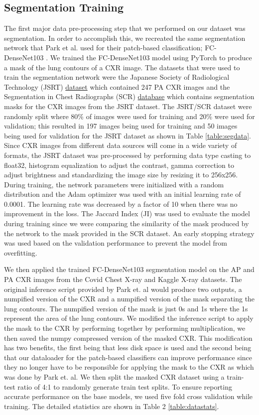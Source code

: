 \documentclass{sigkddExp}
\begin{document}
\subsection{Segmentation Training}
The first major data pre-processing step that we performed on our dataset was
segmentation. In order to accomplish this, we recreated the same segmentation
network that Park et al. used for their patch-based classification;
FC-DenseNet103 \cite{DBLP:journals/corr/JegouDVRB16}. We trained the
FC-DenseNet103 model using PyTorch to produce a mask of the lung contours of a
CXR image. The datasets that were used to train the segmentation network were
the Japanese Society of Radiological Technology (JSRT)
\href{http://db.jsrt.or.jp/eng.php}{dataset} which contained 247 PA CXR images
and the Segmentation in Chest Radiographs (SCR)
\href{https://www.isi.uu.nl/Research/Databases/SCR/}{database} which contains
segmentation masks for the CXR images from the JSRT dataset. The JSRT/SCR
dataset were randomly split where 80\% of images were used for training and 20\%
were used for validation; this resulted in 197 images being used for training
and 50 images being used for validation for the JSRT dataset as shown in Table
\ref{table:segdata}. Since CXR images from different data sources will come in a
wide variety of formats, the JSRT dataset was pre-processed by performing data
type casting to float32, histogram equalization to adjust the contrast, gamma
correction to adjust brightness and standardizing the image size by resizing it
to 256x256. During training, the network parameters were initialized with a
random distribution and the Adam optimizer was used with an initial learning
rate of 0.0001. The learning rate was decreased by a factor of 10 when there was
no improvement in the loss. The Jaccard Index (JI) was used to evaluate the
model during training since we were comparing the similarity of the mask
produced by the network to the mask provided in the SCR dataset. An early
stopping strategy was used based on the validation performance to prevent the
model from overfitting.

We then applied the trained FC-DenseNet103 segmentation model on the AP and PA
CXR images from the Covid Chest X-ray and Kaggle X-ray datasets. The original
inference script provided by Park et. al would produce two outputs, a numpified
version of the CXR and a numpified version of the mask separating the lung
contours. The numpified version of the mask is just 0s and 1s where the 1s
represent the area of the lung contours.  We modified the inference script to
apply the mask to the CXR by performing together by performing multiplication,
we then saved the numpy compressed version of the masked CXR. This modification
has two benefits, the first being that less disk space is used and the second
being that our dataloader for the patch-based classifiers can improve
performance since they no longer have to be responsible for applying the mask to
the CXR as which was done by Park et. al. We then split the masked CXR dataset
using a train-test ratio of 4:1 to randomly generate train test splits. To
ensure reporting accurate performance on the base models, we used five fold
cross validation while training. The detailed statistics are shown in Table 2
\ref{table:datastats}.
\end{document}
